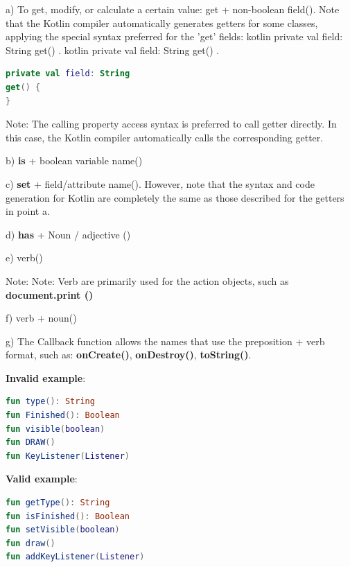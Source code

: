 {{{{{{{{{{{{a) To get, modify, or calculate a certain value: get + non-boolean field(). Note that the Kotlin compiler automatically generates getters for some classes, applying the special syntax preferred for the 'get' fields: kotlin private val field: String get() { }. kotlin private val field: String get() { }.

\begin{lstlisting}[language=Kotlin]
private val field: String
get() {
}
\end{lstlisting}
Note: The calling property access syntax is preferred to call getter directly. In this case, the Kotlin compiler automatically calls the corresponding getter.



b) \textbf{is} + boolean variable name()



c) \textbf{set} + field/attribute name(). However, note that the syntax and code generation for Kotlin are completely the same as those described for the getters in point a.



d) \textbf{has} + Noun / adjective ()



e) verb()

Note: Note: Verb are primarily used for the action objects, such as \textbf{document.print ()}



f) verb + noun() 



g) The Callback function allows the names that use the preposition + verb format, such as: \textbf{onCreate()}, \textbf{onDestroy()}, \textbf{toString()}.



\textbf{Invalid example}: 



\begin{lstlisting}[language=Kotlin]
fun type(): String
fun Finished(): Boolean
fun visible(boolean)
fun DRAW()
fun KeyListener(Listener)
\end{lstlisting}


\textbf{Valid example}: 



\begin{lstlisting}[language=Kotlin]
fun getType(): String
fun isFinished(): Boolean
fun setVisible(boolean)
fun draw()
fun addKeyListener(Listener)
\end{lstlisting}


}}}}}}}}}}}}
